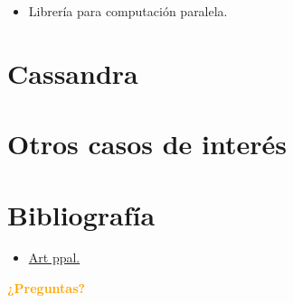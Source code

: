 \documentclass[dvipsnames]{beamer}
\begin{document}
	\begin{frame}
		\begin{itemize}
			\item Librería para computación paralela.
		\end{itemize}
	\end{frame}

        \section{Cassandra}


        \section{Otros casos de interés}


	
	\section{Bibliografía}
	
	\begin{frame}
		\begin{itemize}
		\item \href{https://www.infoq.com/articles/traffic-data-monitoring-iot-kafka-and-spark-streaming}{Art ppal.}
		\end{itemize}
	\end{frame}
	
	\begin{frame}[plain]
		\begin{center}
			\textcolor{orange}{\textbf{¿Preguntas?}}
		\end{center}
	\end{frame}
	
	
\end{document}
